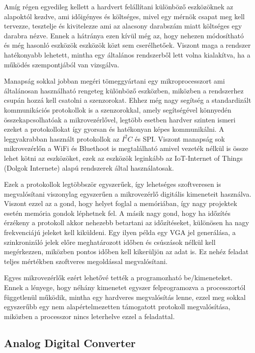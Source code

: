 Amíg régen egyedileg kellett a hardvert felállítani különböző eszközöknek az 
alapoktól kezdve, ami időigényes és költséges, mivel egy mérnök csapat meg kell 
tervezze, tesztelje és kivitelezze ami az alacsony darabszám miatt költséges egy 
darabra nézve. Ennek a hátránya ezen kívül még az, hogy nehezen módosítható és még 
hasonló eszközök eszközök közt sem cserélhetőek. Viszont maga a rendszer hatékonyabb
lehetett, mintha egy általános rendszerből lett volna kialakítva, ha a működés 
szempontjából van vizsgálva.

Manapság sokkal jobban megéri tömeggyártani egy mikroprocesszort ami általánosan 
használható rengeteg különböző eszközben, miközben a rendszerhez csupán hozzá kell 
csatolni a szenzorokat. Ehhez még nagy segítség a standardizált kommunikációs 
protokollok is a szenzorokkal, amely segítségével könnyedén összekapcsolhatóak 
a mikrovezérlővel, legtöbb esetben hardver szinten ismeri ezeket a protokollokat 
így gyorsan és hatékonyan képes kommunikálni. A leggyakrabban használt protokollok 
az $I^2C$ és SPI. Viszont manapság sok mikrovezérlőn a WiFi és Bluethoot is 
megtalálható amivel vezeték nélkül is össze lehet kötni az eszközöket, ezek az 
eszközök leginkább az IoT-Internet of Things (Dolgok Internete) alapú rendszerek
által használatosak.

Ezek a protokollok legtöbbször egyszerűek, így lehetséges szoftveresen is 
megvalósítani viszonylag egyszerűen a mikrovezérlő digitális kimeneteit használva. 
Viszont ezzel az a gond, hogy helyet foglal a memóriában, így nagy projektek esetén 
memória gondok léphetnek fel. A másik nagy gond, hogy ha időzítés érzékeny a 
protokoll akkor nehezebb betartani az időzítéseket, különösen ha nagy frekvenciájú 
jeleket kell kiküldeni. Egy ilyen példa egy VGA jel generálása, a szinkronizáló 
jelek előre meghatározott időben és csúszások nélkül kell megérkezzen, miközben 
pontos időben kell kikerüljön az adat is. Ez nehéz feladat teljes mértékben 
szoftveres megoldással megvalósítani.

Egyes mikrovezérlők ezért lehetővé tették a programozható be/kimeneteket. Ennek 
a lényege, hogy néhány kimenetet egyszer felprogramozva a processzortól függetlenül 
működik, mintha egy hardveres megvalósítás lenne, ezzel meg sokkal egyszerűbb egy 
nem alapértelmezetten támogatott protokoll megvalósítása, miközben a processzor 
nincs leterhelve ezzel a feladattal.

\subsection{Analog Digital Converter}

